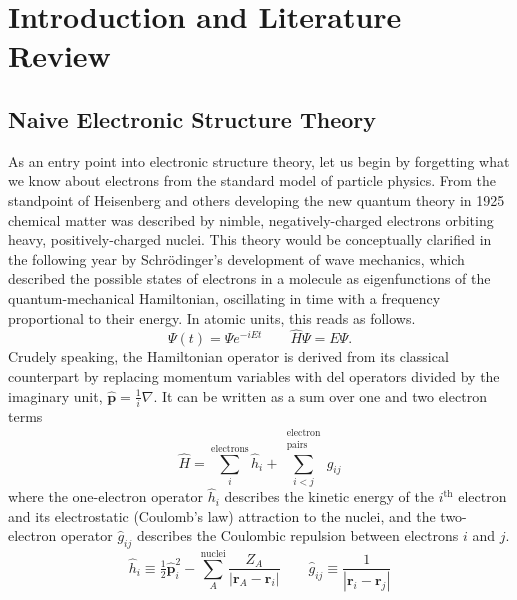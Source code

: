 \chapter[%
    Introduction and Literature Review
]{%
    Introduction and Literature Review
}

\section{Naive Electronic Structure Theory}
\label{sec:introduction:naive-electronic-structure}

As an entry point into electronic structure theory, let us begin by forgetting
what we know about electrons from the standard model of particle physics.
From the standpoint of Heisenberg and others developing the new quantum theory
in 1925\cite{Heisenberg:1925p879} chemical matter was described by nimble,
negatively-charged electrons orbiting heavy, positively-charged nuclei.
This theory would be conceptually clarified in the following year by
Schr\"odinger's development of wave mechanics,
\cite{Schrodinger:1926p361,Schrodinger:1926p489,Schrodinger:1926p734} which
described the possible states of electrons in a molecule as eigenfunctions of
the quantum-mechanical Hamiltonian, oscillating in time with a frequency
proportional to their energy.
In atomic units, this reads as follows.
\begin{equation}
    \Psi(t)
    =
    \Psi
    e^{-iEt}
    \qquad
    \hat{H}
    \Psi
    =
    E
    \Psi.
\end{equation}
Crudely speaking, the Hamiltonian operator is derived from its classical
counterpart by replacing momentum variables with del operators divided by the
imaginary unit,
\(
    \hat{\mathbf{p}}
    =
    \frac{1}{i}
    \nabla
\).
It can be written as a sum over one and two electron terms
\begin{equation}
    \hat{H}
    =
    \sum_i^\text{electrons}
    \hat{h}_i
    +
    \sum_{i<j}^{\substack{\text{electron}\\\text{pairs}}}
    \hat{g}_{ij}
\end{equation}
where the one-electron operator
\(
    \hat{h}_i
\)
describes the kinetic energy of the \(i^\text{th}\) electron and its
electrostatic (Coulomb's law) attraction to the nuclei, and the two-electron
operator
\(
    \hat{g}_{ij}
\)
describes the Coulombic repulsion between electrons \(i\) and \(j\).
\begin{equation}
    \hat{h}_i
    \equiv
    \tfrac{1}{2}
    \hat{\mathbf{p}}_i^2
    -
    \sum_A^\text{nuclei}
    \frac{Z_A}{|\mathbf{r}_A - \mathbf{r}_i|}
    \qquad
    \hat{g}_{ij}
    \equiv
    \frac{1}{|\mathbf{r}_i - \mathbf{r}_j|}
\end{equation}
